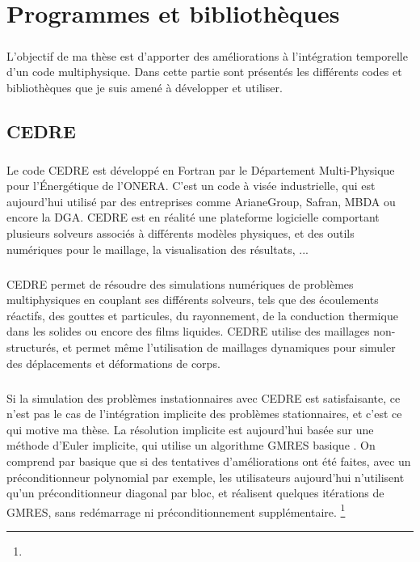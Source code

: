 \chapter{Programmes et bibliothèques}

\paragraph{}
L'objectif de ma thèse est d'apporter des améliorations à l'intégration temporelle d'un code multiphysique.
Dans cette partie sont présentés les différents codes et bibliothèques que je suis amené à développer et utiliser.

\section{CEDRE}

  \paragraph{}
  Le code CEDRE est développé en Fortran par le Département Multi-Physique pour l'Énergétique de l'ONERA.
  C'est un code à visée industrielle, qui est aujourd'hui utilisé par des entreprises comme ArianeGroup, Safran, MBDA ou encore la DGA.
  CEDRE est en réalité une plateforme logicielle comportant plusieurs solveurs associés à différents modèles physiques, et des outils numériques pour le maillage, la visualisation des résultats, ...

  \paragraph{}
  CEDRE permet de résoudre des simulations numériques de problèmes multiphysiques en couplant ses différents solveurs, tels que des écoulements réactifs, des gouttes et particules, du rayonnement, de la conduction thermique dans les solides ou encore des films liquides.
  CEDRE utilise des maillages non-structurés, et permet même l'utilisation de maillages dynamiques pour simuler des déplacements et déformations de corps.

  \paragraph{}
  Si la simulation des problèmes instationnaires avec CEDRE est satisfaisante, ce n'est pas le cas de l'intégration implicite des problèmes stationnaires, et c'est ce qui motive ma thèse.
  La résolution implicite est aujourd'hui basée sur une méthode d'Euler implicite, qui utilise un algorithme GMRES basique \cite{Selva1998}.
  On comprend par basique que si des tentatives d'améliorations ont été faites, avec un préconditionneur polynomial par exemple, les utilisateurs aujourd'hui n'utilisent qu'un préconditionneur diagonal par bloc, et réalisent quelques itérations de GMRES, sans redémarrage ni préconditionnement supplémentaire.
  \footnote{}

